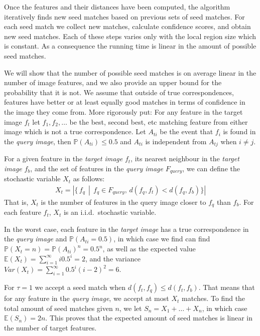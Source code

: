 \documentclass[runningheads]{llncs}
\begin{document}
Once the features and their distances have been computed, the algorithm iteratively finds new seed matches based on previous sets of seed matches. For each seed match we collect new matches, calculate confidence scores, and obtain new seed matches. Each of these steps varies only with the local region size which is constant. As a consequence the running time is linear in the amount of possible seed matches.

We will show that the number of possible seed matches is on average linear in the number of image features, and we also provide an upper bound for the probability that it is not. We assume that outside of true correspondences, features have better or at least equally good matches in terms of confidence in the image they come from. More rigorously put: For any feature in the target image $f_t$ let $f_1, f_2, \ldots$ be the best, second best, etc matching feature from either image which is not a true correspondence. Let $A_{ti}$ be the event that $f_i$ is found in the \emph{query image}, then $\mathbb{P}(A_{ti}) \leq 0.5$ and $A_{ti}$ is independent from $A_{tj}$ when $i \ne j$.

For a given feature in the \emph{target image} $f_t$, its nearest neighbour in the \emph{target image} $f_b$, and the set of features in the \emph{query image} $F_{query}$, we can define the stochastic variable $X_t$ as follows:
\begin{align}
    X_t = \left| \{ \, f_q \, \middle| \, f_q \in F_{query},\, d(f_q, f_t) < d(f_q, f_b) \} \right|
\end{align}
That is, $X_t$ is the number of features in the query image closer to $f_q$ than $f_b$. For each feature $f_t$, $X_t$ is an i.i.d.~stochastic variable. 

In the worst case, each feature in the \emph{target image} has a true correspondence in the \emph{query image} and $\mathbb{P}(A_{ti} = 0.5)$, in which case we find can find $\mathbb{P}(X_t = n) = \mathbb{P}(A_{ti})^n = 0.5^n$, as well as the expected value $\mathbb{E}(X_t) = \sum_{i=1}^\infty i0.5^i = 2$, and the variance $Var(X_t) = \sum_{i=1}^\infty 0.5^i(i - 2)^2 = 6$.

For $\tau = 1$ we accept a seed match when $d(f_t, f_q) \leq d(f_t, f_b)$. That means that for any feature in the \emph{query image}, we accept at most $X_t$ matches. To find the total amount of seed matches given $n$, we let $S_n = X_1 + \ldots + X_n$, in which case $\mathbb{E}(S_n) = 2n$. This proves that the expected amount of seed matches is linear in the number of target features. 
\end{document}
